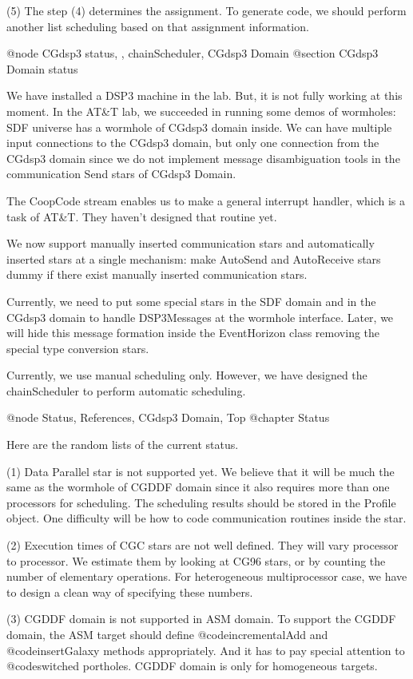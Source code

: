 {(5) The step (4) determines the assignment. To generate code, we should
perform another list scheduling based on that assignment information.

@node CGdsp3 status, , chainScheduler, CGdsp3 Domain
@section CGdsp3 Domain status

We have installed a DSP3 machine in the lab. But, it is not fully working
at this moment. In the AT&T lab, we succeeded in running some demos of
wormholes: SDF universe has a wormhole of CGdsp3 domain inside.
We can have multiple input connections to the CGdsp3 domain, but only
one connection from the CGdsp3 domain since we do not implement
message disambiguation tools in the communication Send stars of CGdsp3 Domain.

The CoopCode stream enables us to make a general interrupt handler, which is
a task of AT&T. They haven't designed that routine yet.

We now support manually inserted communication stars and 
automatically inserted stars at a single mechanism: make AutoSend and 
AutoReceive stars dummy if there exist manually inserted communication stars.

Currently, we need to put some special stars in the SDF domain and in the
CGdsp3 domain to handle DSP3Messages at the wormhole interface. Later,
we will hide this message formation inside the EventHorizon class removing
the special type conversion stars.

Currently, we use manual scheduling only. However, we have designed
the chainScheduler to perform automatic scheduling.
 
@node Status, References, CGdsp3 Domain, Top
@chapter Status

Here are the random lists of the current status.

(1) Data Parallel star is not supported yet. We believe that it will be
much the same as the wormhole of CGDDF domain since it also requires more than
one processors for scheduling. The scheduling results should be stored in 
the Profile object. One difficulty will be how to code communication routines
inside the star.

(2) Execution times of CGC stars are not well defined. They will vary
processor to processor. We estimate them by looking at CG96 stars, or
by counting the number of elementary operations. For heterogeneous
multiprocessor case, we have to design a clean way of specifying these numbers.

(3) CGDDF domain is not supported in ASM domain. To support the CGDDF domain,
the ASM target should define @code{incrementalAdd} and @code{insertGalaxy}
methods appropriately. And it has to pay special attention to
@code{switched} portholes. CGDDF domain is only for homogeneous targets.

}
